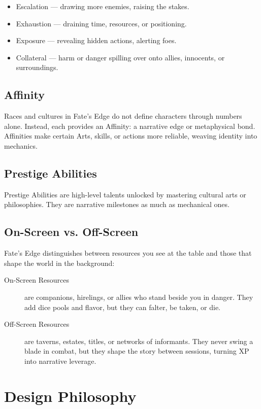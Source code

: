 \begin{itemize}
\item Escalation --- drawing more enemies, raising the stakes.
\item Exhaustion --- draining time, resources, or positioning.
\item Exposure --- revealing hidden actions, alerting foes.
\item Collateral --- harm or danger spilling over onto allies, innocents, or surroundings.
\end{itemize}

\subsection{Affinity}

Races and cultures in Fate's Edge do not define characters through numbers alone. Instead, each provides an Affinity: a narrative edge or metaphysical bond. Affinities make certain Arts, skills, or actions more reliable, weaving identity into mechanics.

\subsection{Prestige Abilities}

Prestige Abilities are high-level talents unlocked by mastering cultural arts or philosophies. They are narrative milestones as much as mechanical ones.

\subsection{On-Screen vs. Off-Screen}

Fate's Edge distinguishes between resources you see at the table and those that shape the world in the background:

\begin{description}
\item[On-Screen Resources] are companions, hirelings, or allies who stand beside you in danger. They add dice pools and flavor, but they can falter, be taken, or die.
\item[Off-Screen Resources] are taverns, estates, titles, or networks of informants. They never swing a blade in combat, but they shape the story between sessions, turning XP into narrative leverage.
\end{description}

\section{Design Philosophy}

